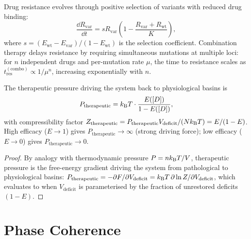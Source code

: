 \begin{theorem}
\label{thm:ch07-resistance}
Drug resistance evolves through positive selection of variants with
reduced drug binding:
\begin{equation}
  \frac{\dd R_{\mathrm{var}}}{\dd t}
  = s R_{\mathrm{var}}\!\left(1 - \frac{R_{\mathrm{var}} + R_{\mathrm{wt}}}{K}\right),
  \label{eq:ch07-resistance}
\end{equation}
where $s = (E_{\mathrm{wt}} - E_{\mathrm{var}})/(1 - E_{\mathrm{wt}})$ is
the selection coefficient.  Combination therapy delays resistance by
requiring simultaneous mutations at multiple loci: for $n$ independent drugs
and per-mutation rate $\mu$, the time to resistance scales as
$t_{\mathrm{res}}^{(\mathrm{combo})} \propto 1/\mu^n$, increasing
exponentially with $n$.
\end{theorem}

\begin{theorem}
\label{thm:ch07-therapeutic-pressure}
The therapeutic pressure driving the system back to physiological basins is
\begin{equation}
  P_{\mathrm{therapeutic}}
  = k_{\mathrm{B}} T\cdot\frac{E([D])}{1 - E([D])},
  \label{eq:ch07-therapeutic-pressure}
\end{equation}
with compressibility factor
$Z_{\mathrm{therapeutic}} = P_{\mathrm{therapeutic}} V_{\mathrm{deficit}} / (Nk_{\mathrm{B}} T) = E/(1-E)$.
High efficacy ($E \to 1$) gives $P_{\mathrm{therapeutic}} \to \infty$
(strong driving force); low efficacy ($E \to 0$) gives $P_{\mathrm{therapeutic}} \to 0$.
\end{theorem}

\begin{proof}
By analogy with thermodynamic pressure $P = nk_{\mathrm{B}} T/V$, therapeutic pressure
is the free-energy gradient driving the system from pathological to
physiological basins:
$P_{\mathrm{therapeutic}} = -\partial F/\partial V_{\mathrm{deficit}}
= k_{\mathrm{B}} T\,\partial\ln Z/\partial V_{\mathrm{deficit}}$,
which evaluates to  when $V_{\mathrm{deficit}}$
is parameterised by the fraction of unrestored deficits $(1-E)$.
\end{proof}

\section{Phase Coherence}
\label{sec:phase-coherence}

